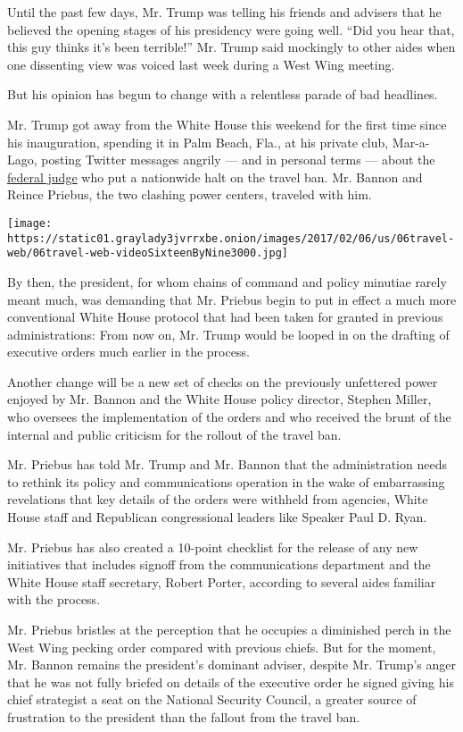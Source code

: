 Until the past few days, Mr. Trump was telling his friends and advisers
that he believed the opening stages of his presidency were going well.
``Did you hear that, this guy thinks it's been terrible!'' Mr. Trump
said mockingly to other aides when one dissenting view was voiced last
week during a West Wing meeting.

But his opinion has begun to change with a relentless parade of bad
headlines.

Mr. Trump got away from the White House this weekend for the first time
since his inauguration, spending it in Palm Beach, Fla., at his private
club, Mar-a-Lago, posting Twitter messages angrily --- and in personal
terms --- about the
\href{https://twitter.com/realDonaldTrump/status/827867311054974976}{federal
judge} who put a nationwide halt on the travel ban. Mr. Bannon and
Reince Priebus, the two clashing power centers, traveled with him.

\texttt{[image: https://static01.graylady3jvrrxbe.onion/images/2017/02/06/us/06travel-web/06travel-web-videoSixteenByNine3000.jpg]}

By then, the president, for whom chains of command and policy minutiae
rarely meant much, was demanding that Mr. Priebus begin to put in effect
a much more conventional White House protocol that had been taken for
granted in previous administrations: From now on, Mr. Trump would be
looped in on the drafting of executive orders much earlier in the
process.

Another change will be a new set of checks on the previously unfettered
power enjoyed by Mr. Bannon and the White House policy director, Stephen
Miller, who oversees the implementation of the orders and who received
the brunt of the internal and public criticism for the rollout of the
travel ban.

Mr. Priebus has told Mr. Trump and Mr. Bannon that the administration
needs to rethink its policy and communications operation in the wake of
embarrassing revelations that key details of the orders were withheld
from agencies, White House staff and Republican congressional leaders
like Speaker Paul D. Ryan.

Mr. Priebus has also created a 10-point checklist for the release of any
new initiatives that includes signoff from the communications department
and the White House staff secretary, Robert Porter, according to several
aides familiar with the process.

Mr. Priebus bristles at the perception that he occupies a diminished
perch in the West Wing pecking order compared with previous chiefs. But
for the moment, Mr. Bannon remains the president's dominant adviser,
despite Mr. Trump's anger that he was not fully briefed on details of
the executive order he signed giving his chief strategist a seat on the
National Security Council, a greater source of frustration to the
president than the fallout from the travel ban.


